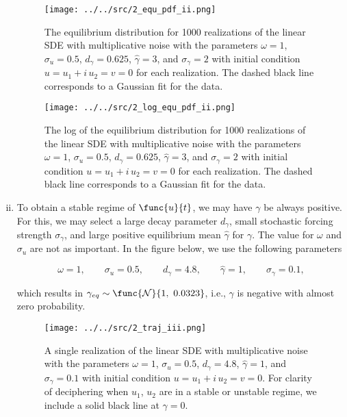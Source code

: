 \begin{enumerate}[(i)]
	\begin{figure}[H]
		\centering
		\texttt{[image: ../../src/2\_equ\_pdf\_ii.png]}
		\caption{The equilibrium distribution for 1000 realizations of the linear SDE with multiplicative noise with the parameters $\omega = 1$, $\sigma_u = 0.5$, $d_{\gamma} = 0.625$, $\widehat{\gamma} = 3$, and $\sigma_{\gamma} = 2$ with initial condition $u = u_1 + i\,u_2 = v = 0$ for each realization. The dashed black line corresponds to a Gaussian fit for the data.}
		\label{fig:2_equ_pdf_ii}
	\end{figure}
	
	\begin{figure}[H]
		\centering
		\texttt{[image: ../../src/2\_log\_equ\_pdf\_ii.png]}
		\caption{The log of the equilibrium distribution for 1000 realizations of the linear SDE with multiplicative noise with the parameters $\omega = 1$, $\sigma_u = 0.5$, $d_{\gamma} = 0.625$, $\widehat{\gamma} = 3$, and $\sigma_{\gamma} = 2$ with initial condition $u = u_1 + i\,u_2 = v = 0$ for each realization. The dashed black line corresponds to a Gaussian fit for the data.}
		\label{fig:2_log_equ_pdf_ii}
	\end{figure}
	
	\item To obtain a stable regime of $\func{u}{t}$, we may have $\gamma$ be always positive. For this, we may select a large decay parameter $d_{\gamma}$, small stochastic forcing strength $\sigma_{\gamma}$, and large positive equilibrium mean $\widehat{\gamma}$ for $\gamma$. The value for $\omega$ and $\sigma_u$ are not as important. In the figure below, we use the following parameters
	
	\begin{equation}
		\omega = 1,\qquad \sigma_u = 0.5,\qquad d_{\gamma} = 4.8,\qquad \widehat{\gamma} = 1,\qquad \sigma_{\gamma} = 0.1,
	\end{equation}
	
	which results in $\gamma_{eq} \sim \func{\mathcal{N}}{1,\ 0.0323}$, i.e., $\gamma$ is negative with almost zero probability.
	

	\begin{figure}[H]
		\centering
		\texttt{[image: ../../src/2\_traj\_iii.png]}
		\caption{A single realization of the linear SDE with multiplicative noise with the parameters $\omega = 1$, $\sigma_u = 0.5$, $d_{\gamma} = 4.8$, $\widehat{\gamma} = 1$, and $\sigma_{\gamma} = 0.1$ with initial condition $u = u_1 + i\,u_2 = v = 0$. For clarity of deciphering when $u_1$, $u_2$ are in a stable or unstable regime, we include a solid black line at $\gamma = 0$.}
		\label{fig:2_traj_iii}
	\end{figure}


\end{enumerate}
